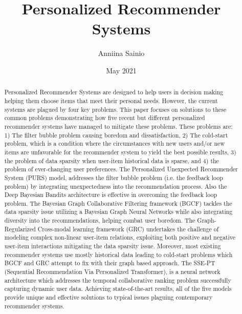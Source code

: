 \documentclass[english,twoside,censored,tkt]{HYthesisML}
\title{
Personalized Recommender Systems}
\author{Anniina Sainio}
\date{May 2021}
\begin{document}
\maketitle
\begin{otherlanguage}{english}
\begin{abstract}
Personalized Recommender Systems are designed to help users in decision making helping them choose items that meet their personal needs. However, the current systems are plagued by four key problems. This paper focuses on solutions to these common problems demonstrating how five recent but different personalized recommender systems have managed to mitigate these problems. These problems are: 1) The filter bubble problem causing boredom and dissatisfaction, 2) The cold-start problem, which is a condition where the circumstances  with new users and/or new items are unfavorable for the recommender system to yield the best possible results, 3) the problem of data sparsity when user-item historical data is sparse, and 4) the problem of ever-changing user preferences. The Personalized Unexpected Recommender System (PURS) model, addresses the filter bubble problem (i.e. the feedback loop problem) by integrating unexpectedness into the recommendation process. Also the Deep Bayesian Bandits architecture is effective in overcoming the feedback loop problem. The Bayesian Graph Collaborative Filtering framework (BGCF) tackles the data sparsity issue utilizing a Bayesian Graph Neural Networks while also integrating diversity into the recommendations, helping combat user boredom. The Graph-Regularized Cross-modal learning framework (GRC) undertakes the challenge of modeling complex non-linear user-item relations, exploiting both positive and negative user-item interactions mitigating the data sparsity issue. Moreover, most existing recommender systems use mostly historical data leading to cold-start problems which BGCF and GRC attempt to fix with their graph based approach. The SSE-PT (Sequential Recommendation Via Personalized Transformer), is a neural network architecture which addresses the temporal collaborative ranking problem successfully capturing dynamic user data. Achieving state-of-the-art results, all of the five models provide unique and effective solutions to typical issues plaguing contemporary recommender systems.
\end{abstract}
\end{otherlanguage}

\newpage
\mytableofcontents
\frontmatter
\mainmatter

{}  
\printbibliography
\end{document}
